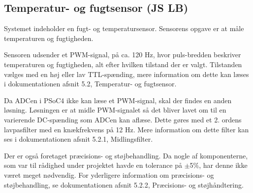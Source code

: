 \subsection{Temperatur- og fugtsensor (JS LB)}


Systemet indeholder en fugt- og temperatursensor. Sensorens opgave er at måle temperaturen og fugtigheden.

Sensoren udsender et PWM-signal, på ca. 120 Hz, hvor puls-bredden beskriver temperaturen og fugtigheden, alt efter hvilken tilstand der er valgt. Tilstanden vælges med en høj eller lav TTL-spænding, mere information om dette kan læses i dokumentationen afsnit 5.2, Temperatur- og fugtsensor.

Da ADCen i PSoC4 ikke kan læse et PWM-signal, skal der findes en anden løsning. Løsningen er at midle PWM-signalet så det bliver lavet om til en varierende DC-spænding som ADCen kan aflæse. Dette gøres med et 2. ordens lavpasfilter med en knækfrekvens på 12 Hz. Mere information om dette filter kan ses i dokumentationen afsnit 5.2.1, Midlingsfilter.
 
Der er også foretaget præcisions- og støjbehandling. Da nogle af komponenterne, som var til rådighed under projektet havde en tolerance på $\pm$5\%, har denne ikke været meget nødvendig. For yderligere information om præcisions- og støjbehandling, se dokumentationen afsnit 5.2.2, Præcisions- og støjhåndtering. 